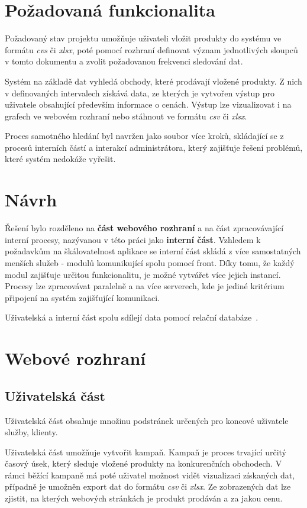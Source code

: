 \documentclass[thesis=B,czech]{FITthesis}[2012/06/26]
\begin{document}
\section{Požadovaná funkcionalita}
Požadovaný stav projektu umožňuje uživateli vložit produkty do systému ve formátu \textit{cvs} či \textit{xlsx}, poté pomocí
rozhraní definovat význam jednotlivých sloupců v tomto dokumentu a zvolit požadovanou frekvenci sledování dat.
\par
Systém na základě dat vyhledá obchody, které prodávají vložené produkty. Z nich v definovaných intervalech získává data, ze kterých je vytvořen výstup pro uživatele obsahující především informace o cenách. Výstup lze vizualizovat i na grafech ve webovém rozhraní nebo stáhnout ve formátu
\textit{csv} či \textit{xlsx}.
\par
Proces samotného hledání byl navržen jako soubor více kroků, skládající se z procesů interních částí a interakcí administrátora, který zajišťuje
řešení problémů, které systém nedokáže vyřešit.

\section{Návrh}
Řešení bylo rozděleno na \textbf{část webového rozhraní} a na část zpracovávající interní procesy, nazývanou v této práci 
jako \textbf{interní část}.
Vzhledem k požadavkům na škálovatelnost aplikace se interní část skládá z více samostatných menších služeb - modulů komunikující
spolu pomocí front. Díky tomu, že každý modul zajišťuje určitou funkcionalitu, je možné vytvářet více jejich instancí. Procesy lze 
zpracovávat paralelně a na více serverech, kde je jediné kritérium připojení na systém zajišťující komunikaci.
\par
Uživatelská a interní část spolu sdílejí data pomocí relační databáze~\cite{DB}.

\section{Webové rozhraní}

\subsection{Uživatelská část}\label{ch:analysis-front-end}
Uživatelská část obsahuje množinu podstránek určených pro koncové uživatele
služby, klienty.
\par
Uživatelská část umožňuje vytvořit kampaň. Kampaň je proces trvající určitý časový úsek, který sleduje vložené produkty na konkurenčních
obchodech.
V rámci běžící kampaně má poté uživatel možnost vidět vizualizaci získaných dat, případně je umožněn export dat do formátu
\textit{csv} či \textit{xlsx}. Ze zobrazených dat lze zjistit, na kterých webových stránkách je produkt prodáván a za jakou cenu.
\end{document}
